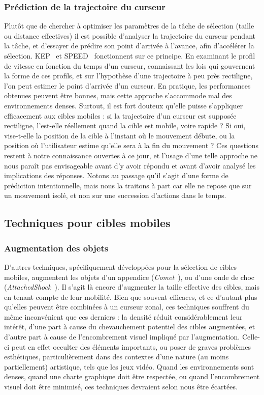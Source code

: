 	\subsubsection{Prédiction de la trajectoire du curseur}
    Plutôt que de chercher à optimiser les paramètres de la tâche de sélection (taille ou distance effectives) il est possible d'analyser la trajectoire du curseur pendant la tâche, et d'essayer de prédire son point d'arrivée à l'avance, afin d'accélérer la sélection. KEP~\cite{lank2007endpoint} et SPEED~\cite{wonner2011speed} fonctionnent sur ce principe. En examinant le profil de vitesse en fonction du temps d'un curseur, connaissant les lois qui gouvernent la forme de ces profils, et sur l'hypothèse d'une trajectoire à peu près rectiligne, l'on peut estimer le point d'arrivée d'un curseur. En pratique, les performances obtenues peuvent être bonnes, mais cette approche s'accommode mal des environnements denses. Surtout, il est fort douteux qu'elle puisse s'appliquer efficacement aux cibles mobiles : si la trajectoire d'un curseur est supposée rectiligne, l'est-elle réellement quand la cible est mobile, voire rapide ? Si oui, vise-t-elle la position de la cible à l'instant où le mouvement débute, ou la position où l'utilisateur estime qu'elle sera à la fin du mouvement ? Ces questions restent à notre connaissance ouvertes à ce jour, et l'usage d'une telle approche ne nous paraît pas envisageable avant d'y avoir répondu et avant d'avoir analysé les implications des réponses. Notons au passage qu'il s'agit d'une forme de prédiction intentionnelle, mais nous la traitons à part car elle ne repose que sur un mouvement isolé, et non sur une succession d'actions dans le temps.

    \subsection{Techniques pour cibles mobiles}
	\subsubsection{Augmentation des objets}
    D'autres techniques, spécifiquement développées pour la sélection de cibles mobiles, augmentent les objets d'un appendice (\emph{Comet}~\cite{hasan2011comet}), ou d'une onde de choc (\emph{AttachedShock}~\cite{you2012attachedshock, you2014attachedshock}). Il s'agit là encore d'augmenter la taille effective des cibles, mais en tenant compte de leur mobilité. Bien que souvent efficaces, et ce d'autant plus qu'elles peuvent être combinées à un curseur zonal, ces techniques souffrent du même inconvénient que ces derniers : la densité réduit considérablement leur intérêt, d'une part à cause du chevauchement potentiel des cibles augmentées, et d'autre part à cause de l'encombrement visuel impliqué par l'augmentation. Celle-ci peut en effet occulter des éléments importants, ou poser de graves problèmes esthétiques, particulièrement dans des contextes d'une nature (au moins partiellement) artistique, tels que les jeux vidéo. Quand les environnements sont denses, quand une charte graphique doit être respectée, ou quand l'encombrement visuel doit être minimisé, ces techniques devraient selon nous être écartées.
    
